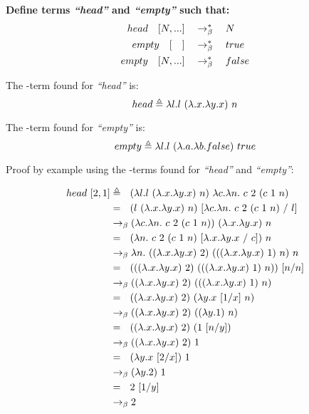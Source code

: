 \documentclass{article}
\begin{document}
	\begin{Large}
	
		\textbf{Define terms \textit{``head''} and \textit{``empty''} such that:}
		\begin{align*}
			head \quad [ N, ...] &\quad \rightarrow_\beta^*\quad  N\\
			empty \quad [\quad] &\quad \rightarrow_\beta^*\quad true\\
			empty \quad [ N, ...] &\quad \rightarrow_\beta^*\quad false
		\end{align*}
		\newline
		
		The \lamb -term found for \textit{``head''} is:
		\begin{equation*}
			head \triangleq \la l.l \ (\la .x.\la y.x) \ n
		\end{equation*}
		
		The \lamb -term found for \textit{``empty''} is:
		\begin{equation*}
			empty \triangleq \la l.l \ (\la .a.\la b.false) \ true
		\end{equation*}
		\newline
		
		Proof by example using the \lamb -terms found for  \textit{``head''} and \textit{``empty''}:
		
		\begin{align*}
			head \ [2,1] &\triangleq \saq (\la l.l \ (\la .x.\la y.x) \ n) \ \la c.\la n. \ c \ 2 \ (c \ 1 \ n) \\
			&= \saq (l \ (\la .x.\la y.x) \ n) \ [\la c.\la n. \ c \ 2 \ (c \ 1 \ n) \ / \ l] \\
			&\equals (\la c.\la n. \ c \ 2 \ (c \ 1 \ n)) \ (\la .x.\la y.x) \ n \\
			&= \saq (\la n. \ c \ 2 \ (c \ 1 \ n) \ [\la .x.\la y.x \ / \ c] ) \ n \\
			&\equals \la n.\ ((\la .x.\la y.x) \ 2) \ (((\la .x.\la y.x) \ 1) \ n) \ n \\
			&= \saq (((\la .x.\la y.x) \ 2) \ (((\la .x.\la y.x) \ 1) \ n)) \ [n / n] \\
			&\equals ((\la .x.\la y.x) \ 2) \ (((\la .x.\la y.x) \ 1) \ n) \\
			&= \saq ((\la .x.\la y.x) \ 2) \ (\la y.x \ [1 / x] \ n) \\
			&\equals ((\la .x.\la y.x) \ 2) \ ((\la y.1 ) \ n) \\
			&= \saq ((\la .x.\la y.x) \ 2) \ (1 \ [n/y]) \\
			&\equals ((\la .x.\la y.x) \ 2) \ 1 \\
			&= \saq (\la y.x\ [2/x]) \ 1 \\
			&\equals (\la y.2) \ 1 \\
			&= \saq 2 \ [1/y] \\
			&\equals 2
		\end{align*}
		

\end{Large}
\end{document}
